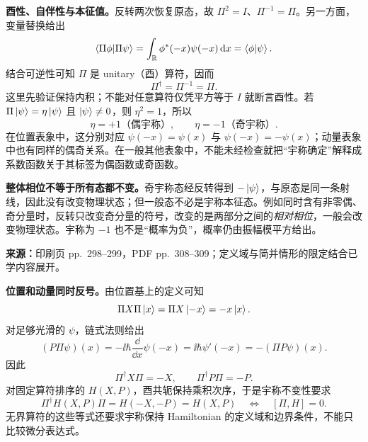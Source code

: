 \textbf{酉性、自伴性与本征值。}反转两次恢复原态，故 $\Pi^2=I$、$\Pi^{-1}=\Pi$。另一方面，变量替换给出
\begin{equation}
  \left\langle \Pi\phi \middle| \Pi\psi \right\rangle
    =\int_{\mathbb{R}}\phi^*(-x)\psi(-x)\mathop{}\!\mathrm{d} x
    =\left\langle \phi \middle| \psi \right\rangle.
\end{equation}
结合可逆性可知 $\Pi$ 是 unitary（酉）算符，因而
\begin{equation}
  \boxed{\Pi^\dagger=\Pi^{-1}=\Pi}.
\end{equation}
这里先验证保持内积；不能对任意算符仅凭平方等于 $I$ 就断言酉性。若 $\Pi\left|\psi\right\rangle=\eta\left|\psi\right\rangle$ 且 $\left|\psi\right\rangle\ne0$，则 $\eta^2=1$，所以
\begin{equation}
  \boxed{\eta=+1\text{（偶宇称）},\qquad
         \eta=-1\text{（奇宇称）}}.
\end{equation}
在位置表象中，这分别对应 $\psi(-x)=\psi(x)$ 与 $\psi(-x)=-\psi(x)$；动量表象中也有同样的偶奇关系。在一般其他表象中，不能未经检查就把“宇称确定”解释成系数函数关于其标签为偶函数或奇函数。

\textbf{整体相位不等于所有态都不变。}奇宇称态经反转得到 $-\left|\psi\right\rangle$，与原态是同一条射线，因此没有改变物理状态；但一般态不必是宇称本征态。例如同时含有非零偶、奇分量时，反转只改变奇分量的符号，改变的是两部分之间的\emph{相对相位}，一般会改变物理状态。宇称为 $-1$ 也不是“概率为负”，概率仍由振幅模平方给出。

\textbf{来源：}印刷页 pp.~298--299，PDF pp.~308--309；定义域与简并情形的限定结合已学内容展开。

\textbf{位置和动量同时反号。}由位置基上的定义可知
\begin{equation}
  \Pi X\Pi\left|x\right\rangle=\Pi X\left|-x\right\rangle=-x\left|x\right\rangle.
\end{equation}
对足够光滑的 $\psi$，链式法则给出
\begin{equation}
  (P\Pi\psi)(x)
   =-\ii\hbar\frac{\dd}{\dd x}\psi(-x)
   =\ii\hbar\psi'(-x)=-(\Pi P\psi)(x).
\end{equation}
因此
\begin{equation}
  \boxed{\Pi^\dagger X\Pi=-X,\qquad
         \Pi^\dagger P\Pi=-P}.
\end{equation}
对固定算符排序的 $H(X,P)$，酉共轭保持乘积次序，于是宇称不变性要求
\begin{equation}
  \boxed{\Pi^\dagger H(X,P)\Pi=H(-X,-P)=H(X,P)}
  \quad\Longleftrightarrow\quad [\Pi,H]=0.
  \label{eq:QM-C11-S04-parity-symmetry}
\end{equation}
无界算符的这些等式还要求宇称保持 Hamiltonian 的定义域和边界条件，不能只比较微分表达式。

